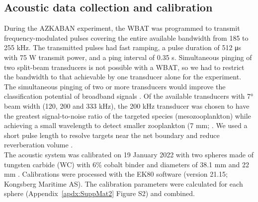 \subsection{Acoustic data collection and calibration}
During the AZKABAN experiment, the WBAT was programmed to transmit frequency-modulated pulses covering the entire available bandwidth from 185 to 255 kHz. The transmitted pulses had fast ramping, a pulse duration of 512 μs with 75 W transmit power, and a ping interval of 0.35 s. Simultaneous pinging of two split-beam transducers is not possible with a WBAT, so we had to restrict the bandwidth to that achievable by one transducer alone for the experiment. The simultaneous pinging of two or more transducers would improve the classification potential of broadband signals \citep{BenoitBird2020}. Of the available transducers with 7° beam width (120, 200 and 333 kHz), the 200 kHz transducer was chosen to have the greatest signal-to-noise ratio of the targeted species (mesozooplankton) while achieving a small wavelength to detect smaller zooplankton (7 mm; \citealt{Simmonds2008}. We used a short pulse length to resolve targets near the net boundary and reduce reverberation volume \citep{Soule1997}. \\
The acoustic system was calibrated on 19 January 2022 with two spheres made of tungsten carbide (WC) with 6\% cobalt binder and diameters of 38.1 mm and 22 mm \citep{Demer2015}. Calibrations were processed with the EK80 software (version 21.15; Kongsberg Maritime AS). The calibration parameters were calculated for each sphere (Appendix~\ref{apdx:SuppMat2} Figure S2) and combined.


